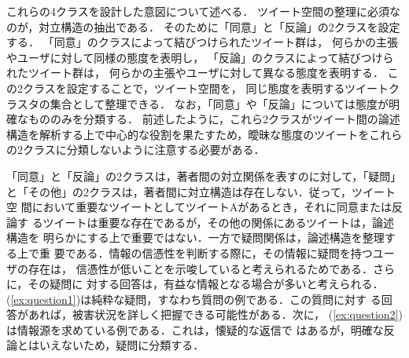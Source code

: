 \documentclass[japanese]{jnlp_1.4}
\newcommand{\addspan}[1]{}
\begin{document}
これらの4クラスを設計した意図について\addspan{，上記の例を参照しつつ}述べる．
ツイート空間の整理に必須なのが，対立構造の抽出である．
そのために「同意」と「反論」の2クラスを設定する．
「同意」のクラスによって結びつけられたツイート群は，
何らかの主張やユーザに対して同様の態度を表明し，
「反論」のクラスによって結びつけられたツイート群は，
何らかの主張やユーザに対して異なる態度を表明する．
この2クラスを設定することで，ツイート空間を，
同じ態度を表明するツイートクラスタの集合として整理できる．
なお，「同意」や「反論」については態度が明確なもののみを分類する．
前述したように，これら2クラスがツイート間の論述構造を解析する上で中心的な役割を果たすため，曖昧な態度のツイートをこれらの2クラスに分類しないように注意する必要がある．
\addspan{
(\ref{ex:agree1})(\ref{ex:agree2})(\ref{ex:counter1})(\ref{ex:other1})(\ref{ex:other2})は，
「コスモ石油の爆発で有害物質の雨が降るというのはデマ」という主旨のツイートに対する返信である．
(\ref{ex:agree1})は主旨を受け入れているので「同意」，(\ref{ex:counter1})
は納得しないことを主張しているので「反論」に分類する．
(\ref{ex:agree2})は「デマです」と返信しているのでやや紛らわしい例である
が，「冷静になろう」という記述から「危険はない」と考えていることが読み取れ，
返信先のツイートの内容に「同意」していると判断できる．
(\ref{ex:other1})は，主旨を受け入れてはいるが，完全に安心はしていないこ
とが読み取れることから，同意とは言えず，「その他」に分類する．
また，(\ref{ex:other2})は主旨を受け入れてはいるが，返信先の情報への同意
よりも自分の考えを表明するためのツイートと読み取れる．このように補足の意図を持つツイートも「その他」に分類する．
}
\addspan{
(\ref{ex:counter4})は発言者に対し強く注意を促すものの例である．
この例のように不用意な拡散をたしなめるものは，拡散しようとするユーザへの反論としてとらえられる．
}

「同意」と「反論」の2クラスは，著者間の対立関係を表すのに対して，「疑問」
と「その他」の2クラスは，著者間に対立構造は存在しない．従って，ツイート空
間において重要なツイートとしてツイートAがあるとき，それに同意または反論す
るツイートは重要な存在であるが，その他の関係にあるツイートは，論述構造を
明らかにする上で重要ではない．一方で疑問関係は，論述構造を整理する上で重
要である．情報の信憑性を判断する際に，その情報に疑問を持つユーザの存在は，
信憑性が低いことを示唆していると考えられるためである．さらに，その疑問に
対する回答は，有益な情報となる場合が多いと考えられる．
(\ref{ex:question1})は純粋な疑問，すなわち質問の例である．この質問に対す
る回答があれば，被害状況を詳しく把握できる可能性がある．次に，
(\ref{ex:question2})は情報源を求めている例である．これは，懐疑的な返信で
はあるが，明確な反論とはいえないため，疑問に分類する．
\end{document}
